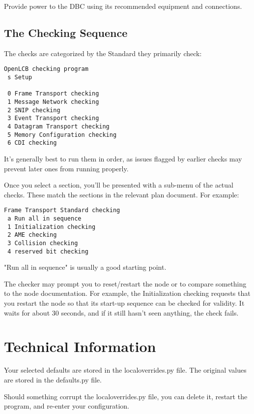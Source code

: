 \documentclass[11pt]{article}
\begin{document}
Provide power to the DBC using its recommended equipment and connections.

\subsection{The Checking Sequence}

The checks are categorized by the Standard they primarily check:

\begin{verbatim}
OpenLCB checking program
 s Setup

 0 Frame Transport checking
 1 Message Network checking
 2 SNIP checking
 3 Event Transport checking
 4 Datagram Transport checking
 5 Memory Configuration checking
 6 CDI checking
\end{verbatim}

It's generally best to run them in order, as issues flagged by earlier
checks may prevent later ones from running properly.

Once you select a section, you'll be presented with a sub-menu of the
actual checks.  These match the sections in the relevant plan document.
For example:

\begin{verbatim}
Frame Transport Standard checking
 a Run all in sequence
 1 Initialization checking
 2 AME checking
 3 Collision checking
 4 reserved bit checking
\end{verbatim}

"Run all in sequence" is usually a good starting point.

The checker may prompt you to reset/restart the node or to 
compare something to the node documentation. For example, 
the Initialization checking requests that you restart the node
so that its start-up sequence can be checked for validity.
It waits for about 30 seconds, and if it still hasn't seen anything, the
check fails.

\section{Technical Information}

Your selected defaults are stored in the localoverrides.py file.
The original values are stored in the defaults.py file.

Should something corrupt the localoverrides.py file,
you can delete it, restart the program, and re-enter your configuration.
\end{document}

